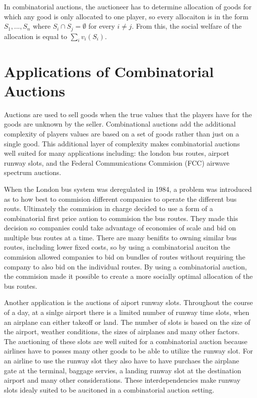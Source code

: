 \documentclass[10pt,onecolumn,letterpaper]{article}
\begin{document}
In combinatorial auctions, the auctioneer has to determine allocation of goods for which any good is only allocated to one player, so every allocaiton is in the form $S_1,...,S_n$ where $S_i \cap S_j = \emptyset$ for every $i \neq j$. From this, the social welfare of the allocation is equal to $\sum_i v_i(S_i)$.

\section{Applications of Combinatorial Auctions}

Auctions are used to sell goods when the true values that the players have for the goods are unknown by the seller. Combinational auctions add the additional complexity of players values are based on a set of goods rather than just on a single good. This additional layer of complexity makes combinatorial auctions well suited for many applications including: the london bus routes, airport runway slots, and the Federal Communications Commision (FCC) airwave spectrum auctions. 

When the London bus system was deregulated in 1984, a problem was introduced as to how best to commision different companies to operate the different bus routs. Ultimately the commision in charge decided to use a form of a combinatorial first price aution to commision the bus routes. They made this decision so companies could take advantage of economies of scale and bid on multiple bus routes at a time. There are many benifits to owning similar bus routes, including lower fixed costs, so by using a combinatorial auciton the commision allowed companies to bid on bundles of routes without requiring the company to also bid on the individual routes. By using a combinatorial auction, the commision made it possible to create a more socially optimal allocation of the bus routes. 

Another application is the auctions of aiport runway slots. Throughout the course of a day, at a sinlge airport there is a limited number of runway time slots, when an airplane can either takeoff or land. The number of slots is based on the size of the airport, weather conditions, the sizes of airplanes and many other factors. The auctioning of these slots are well suited for a combinatorial auction because airlines have to posses many other goods to be able to utilize the runway slot. For an airline to use the runway slot they also have to have purchaes the airplane gate at the terminal, baggage servies, a landing runway slot at the destination airport and many other considerations. These interdependencies make runway slots idealy suited to be aucitoned in a combinatorial auction setting. 
\end{document}
